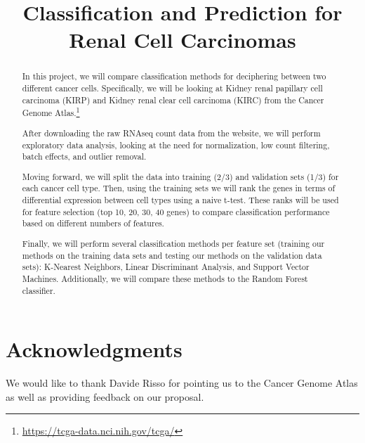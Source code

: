 



\begin{frontmatter}

\title{Classification and Prediction for Renal Cell Carcinomas}




\begin{abstract}

In this project, we will compare classification methods for deciphering between
two different cancer cells. Specifically, we will be looking at Kidney renal
papillary cell carcinoma (KIRP) and Kidney renal clear cell carcinoma (KIRC)
from the Cancer Genome
Atlas.\footnote{\url{https://tcga-data.nci.nih.gov/tcga/}}

After downloading the raw RNAseq count data from the website, we will perform
exploratory data analysis, looking at the need for normalization, low count
filtering, batch effects, and outlier removal.

Moving forward, we will split the data into training (2/3) and validation sets
(1/3) for each cancer cell type. Then, using the training sets we will rank the
genes in terms of differential expression between cell types using a naive
t-test. These ranks will be used for feature selection (top 10, 20, 30, 40
genes) to compare classification performance based on different numbers of
features.

Finally, we will perform several classification methods per feature set
(training our methods on the training data sets and testing our methods on the
validation data sets): K-Nearest Neighbors, Linear Discriminant Analysis, and
Support Vector Machines.  Additionally, we will compare these methods to the
Random Forest classifier.

 
\end{abstract}

\begin{keyword}
\end{keyword}

\end{frontmatter}

\section*{Acknowledgments}
We would like to thank Davide Risso for pointing us to the Cancer Genome
Atlas as well as providing feedback on our proposal.


